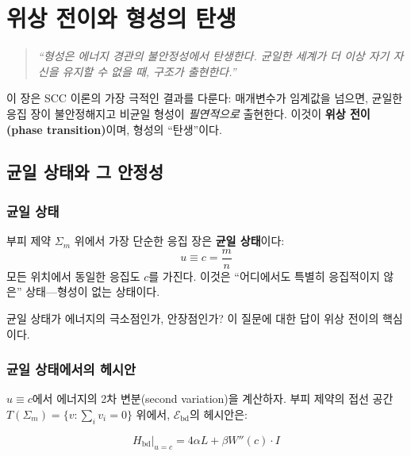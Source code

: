
\chapter{위상 전이와 형성의 탄생}
\label{ch:phase-transition}

\begin{quote}
\textit{``형성은 에너지 경관의 불안정성에서 탄생한다. 균일한 세계가 더 이상 자기 자신을 유지할 수 없을 때, 구조가 출현한다.''}
\end{quote}

이 장은 SCC 이론의 가장 극적인 결과를 다룬다: 매개변수가 임계값을 넘으면, 균일한 응집 장이 불안정해지고 비균일 형성이 \emph{필연적으로} 출현한다. 이것이 \textbf{위상 전이(phase transition)}이며, 형성의 ``탄생''이다.


\section{균일 상태와 그 안정성}
\label{sec:uniform-state}

\subsection{균일 상태}

부피 제약 $\Sigma_m$ 위에서 가장 단순한 응집 장은 \textbf{균일 상태}이다:
\begin{equation}
    u \equiv c = \frac{m}{n}
    \label{eq:uniform-state}
\end{equation}
모든 위치에서 동일한 응집도 $c$를 가진다. 이것은 ``어디에서도 특별히 응집적이지 않은'' 상태---형성이 없는 상태이다.

균일 상태가 에너지의 극소점인가, 안장점인가? 이 질문에 대한 답이 위상 전이의 핵심이다.

\subsection{균일 상태에서의 헤시안}

$u \equiv c$에서 에너지의 2차 변분(second variation)을 계산하자. 부피 제약의 접선 공간 $T(\Sigma_m) = \{v : \sum_i v_i = 0\}$ 위에서, $\mathcal{E}_{\mathrm{bd}}$의 헤시안은:

\begin{equation}
    H_{\mathrm{bd}}\big|_{u=c} = 4\alpha L + \beta W''(c) \cdot I
    \label{eq:hessian-uniform}
\end{equation}

